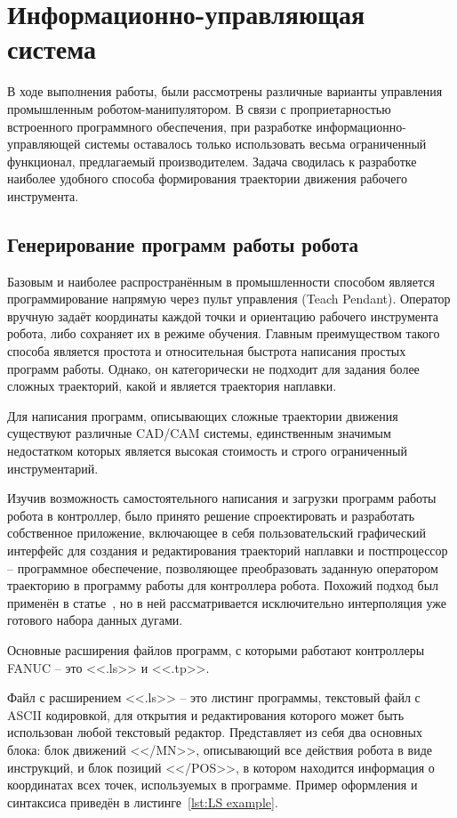 \chapter{Информационно-управляющая система}
В ходе выполнения работы, были рассмотрены различные варианты управления промышленным роботом-манипулятором.
В связи с проприетарностью встроенного программного обеспечения, при разработке информационно-управляющей системы оставалось только использовать весьма ограниченный функционал, предлагаемый производителем.
Задача сводилась к разработке наиболее удобного способа формирования траектории движения рабочего инструмента.


\section{Генерирование программ работы робота}
Базовым и наиболее распространённым в промышленности способом является программирование напрямую через пульт управления (Teach Pendant).
Оператор вручную задаёт координаты каждой точки и ориентацию рабочего инструмента робота, либо сохраняет их в режиме обучения.
Главным преимуществом такого способа является простота и относительная быстрота написания простых программ работы.
Однако, он категорически не подходит для задания более сложных траекторий, какой и является траектория наплавки.

Для написания программ, описывающих сложные траектории движения существуют различные CAD/CAM системы, единственным значимым недостатком которых является высокая стоимость и строго ограниченный инструментарий.

Изучив возможность самостоятельного написания и загрузки программ работы робота в контроллер, было принято решение спроектировать и разработать собственное приложение, включающее в себя пользовательский графический интерфейс для создания и редактирования траекторий наплавки и постпроцессор -- программное обеспечение, позволяющее преобразовать заданную оператором траекторию в программу работы для контроллера робота.
Похожий подход был применён в статье~\cite{Nagata_2017}, но в ней рассматривается исключительно интерполяция уже готового набора данных дугами.

Основные расширения файлов программ, с которыми работают контроллеры FANUC -- это <<.ls>> и <<.tp>>.

Файл с расширением <<.ls>> -- это листинг программы, текстовый файл с ASCII кодировкой, для открытия и редактирования которого может быть использован любой текстовый редактор.
Представляет из себя два основных блока: блок движений <</MN>>, описывающий все действия робота в виде инструкций, и блок позиций <</POS>>, в котором находится информация о координатах всех точек, используемых в программе.
Пример оформления и синтаксиса приведён в листинге~\ref{lst:LS example}.

